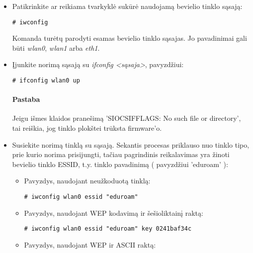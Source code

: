       \begin{itemize}

        \item Patikrinkite ar reikiama tvarkyklė sukūrė naudojamą
          bevielio tinklo sąsają:

          \begin{verbatim}
# iwconfig
          \end{verbatim}

          Komanda turėtų parodyti esamas bevielio tinklo sąsajas. Jo
          pavadinimai gali būti \textsl{wlan0}, \textsl{wlan1} arba
          \textsl{eth1}.

        \item Įjunkite norimą sąsają su \textsl{ifconfig <sąsaja>},
          pavyzdžiui:

          \begin{verbatim}
# ifconfig wlan0 up
          \end{verbatim}

          \paragraph{Pastaba} Jeigu išmes klaidos pranešimą
          'SIOCSIFFLAGS: No such file or directory', tai reiškia, jog
          tinklo plokštei trūksta firmware'o.

        \item Susiekite norimą tinklą su sąsają. Sekantis procesas
          priklauso nuo tinklo tipo, prie kurio norima prisijungti,
          tačiau pagrindinis reikalavimas yra žinoti bevielio tinklo
          ESSID, t.y. tinklo pavadinimą ( pavyzdžiui 'eduroam' ):

          \begin{itemize}
            \item Pavyzdys, naudojant neužkoduotą tinklą:

              \begin{verbatim}
# iwconfig wlan0 essid "eduroam"
              \end{verbatim}

            \item Pavyzdys, naudojant WEP kodavimą ir šešioliktainį
              raktą:

              \begin{verbatim}
# iwconfig wlan0 essid "eduroam" key 0241baf34c
              \end{verbatim}

            \item Pavyzdys, naudojant WEP ir ASCII raktą:


\end{itemize}
\end{itemize}
